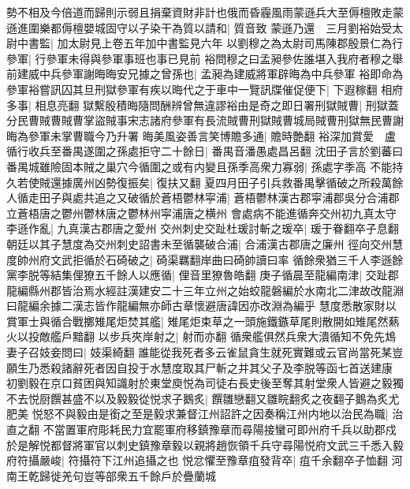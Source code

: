 勢不相及今倍道而歸則示弱且捐棄資財非計也俄而昏霾風雨蒙遜兵大至傉檀敗走蒙遜進圍樂都傉檀嬰城固守以子染干為質以請和|{
	質音致}
蒙遜乃還　三月劉裕始受太尉中書監|{
	加太尉見上卷五年加中書監見六年}
以劉穆之為太尉司馬陳郡殷景仁為行參軍|{
	行參軍未得與參軍事班也事已見前}
裕問穆之曰孟昶參佐誰堪入我府者穆之舉前建威中兵參軍謝晦晦安兄據之曾孫也|{
	孟昶為建威將軍辟晦為中兵參軍}
裕即命為參軍裕嘗訊囚其旦刑獄參軍有疾以晦代之于車中一覽訊牒催促便下|{
	下遐稼翻}
相府多事|{
	相息亮翻}
獄繫殷積晦隨問酬辨曾無違謬裕由是奇之即日署刑獄賊曹|{
	刑獄蓋分民曹賊曹賊曹掌盜賊事宋志諸府參軍有長流賊曹刑獄賊曹城局賊曹刑獄無民曹謝晦為參軍未掌曹職今乃升署}
晦美風姿善言笑博贍多通|{
	贍時艶翻}
裕深加賞愛　盧循行收兵至番禺遂圍之孫處拒守二十餘日|{
	番禺音潘愚處昌呂翻}
沈田子言於劉蕃曰番禺城雖險固本賊之巢穴今循圍之或有内變且孫季高衆力寡弱|{
	孫處字季高}
不能持久若使賊還據廣州凶勢復振矣|{
	復扶又翻}
夏四月田子引兵救番禺擊循破之所殺萬餘人循走田子與處共追之又破循於蒼梧鬱林寜浦|{
	蒼梧鬱林漢古郡寜浦郡吳分合浦郡立蒼梧唐之鬱州鬱林唐之鬱林州寜浦唐之横州}
會處病不能進循奔交州初九真太守李遜作亂|{
	九真漢古郡唐之愛州}
交州刺史交趾杜瑗討斬之瑗卒|{
	瑗于眷翻卒子息翻}
朝廷以其子慧度為交州刺史詔書未至循襲破合浦|{
	合浦漢古郡唐之廉州}
徑向交州慧度帥州府文武拒循於石碕破之|{
	碕渠羈翻岸曲曰碕帥讀曰率}
循餘衆猶三千人李遜餘黨李脱等結集俚獠五千餘人以應循|{
	俚音里獠魯皓翻}
庚子循晨至龍編南津|{
	交趾郡龍編縣州郡皆治焉水經註漢建安二十三年立州之始蛟龍磐編於水南北二津故改龍淵曰龍編余據二漢志皆作龍編無亦師古章懷避唐諱因亦改淵為編乎}
慧度悉散家財以賞軍士與循合戰擲雉尾炬焚其艦|{
	雉尾炬束草之一頭施鐵鏃草尾則散開如雉尾然爇火以投敵艦戶黯翻}
以步兵夾岸射之|{
	射而亦翻}
循衆艦俱然兵衆大潰循知不免先鴆妻子召妓妾問曰|{
	妓渠綺翻}
誰能從我死者多云雀鼠貪生就死實難或云官尚當死某豈願生乃悉殺諸辭死者因自投于水慧度取其尸斬之并其父子及李脱等函七首送建康　初劉毅在京口貧困與知識射於東堂庾悦為司徒右長史後至奪其射堂衆人皆避之毅獨不去悦厨饌甚盛不以及毅毅從悦求子鵝炙|{
	饌雛戀翻又雛睆翻炙之夜翻子鵝為炙尤肥美}
悦怒不與毅由是銜之至是毅求兼督江州詔許之因奏稱江州内地以治民為職|{
	治直之翻}
不當置軍府彫耗民力宜罷軍府移鎮豫章而尋陽接蠻可即州府千兵以助郡戍於是解悦都督將軍官以刺史鎮豫章毅以親將趙恢領千兵守尋陽悦府文武三千悉入毅府符攝嚴峻|{
	符攝符下江州追攝之也}
悦忿懼至豫章疽發背卒|{
	疽千余翻卒子恤翻}
河南王乾歸徙羌句豈等部衆五千餘戶於疊蘭城

